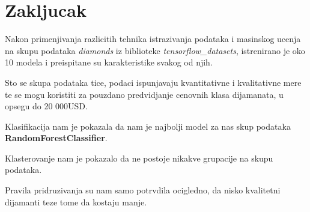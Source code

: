 \documentclass[10pt]{article}
\begin{document}
\section{Zakljucak}
Nakon primenjivanja razlicitih tehnika istrazivanja podataka i masinskog ucenja na skupu podataka \textit{diamonds} iz biblioteke \textit{tensorflow\_datasets}, istrenirano je oko 10 modela i preispitane su karakteristike svakog od njih.

Sto se skupa podataka tice, podaci ispunjavaju kvantitativne i kvalitativne mere te se mogu koristiti za pouzdano predvidjanje cenovnih klasa dijamanata, u opsegu do 20 000USD.

Klasifikacija nam je pokazala da nam je najbolji model za nas skup podataka \textbf{RandomForestClassifier}.

Klasterovanje nam je pokazalo da ne postoje nikakve grupacije na skupu podataka.

Pravila pridruzivanja su nam samo potrvdila ocigledno, da nisko kvalitetni dijamanti teze tome da kostaju manje. 
\end{document}
